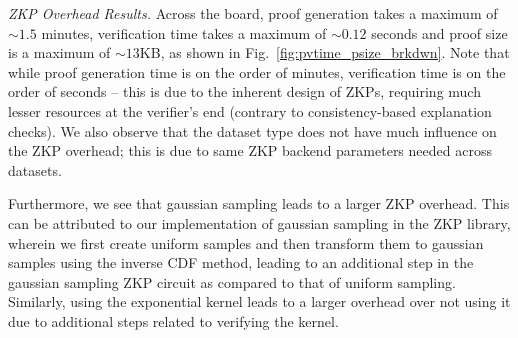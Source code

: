 
\textit{ZKP Overhead Results.} Across the board, proof generation takes a maximum of $\sim1.5$ minutes, verification time takes a maximum of $\sim0.12$ seconds and proof size is a maximum of $\sim13$KB, as shown in Fig.~\ref{fig:pvtime_psize_brkdwn}. Note that while proof generation time is on the order of minutes, verification time is on the order of seconds -- this is due to the inherent design of ZKPs, requiring much lesser resources at the verifier's end (contrary to consistency-based explanation checks). We also observe that the dataset type does not have much influence on the ZKP overhead; this is due to same ZKP backend parameters needed across datasets.

Furthermore, we see that gaussian sampling leads to a larger ZKP overhead. This can be attributed to our implementation of gaussian sampling in the ZKP library, wherein we first create uniform samples and then transform them to gaussian samples using the inverse CDF method, leading to an additional step in the gaussian sampling ZKP circuit as compared to that of uniform sampling. Similarly, using the exponential kernel leads to a larger overhead over not using it due to additional steps related to verifying the kernel.


